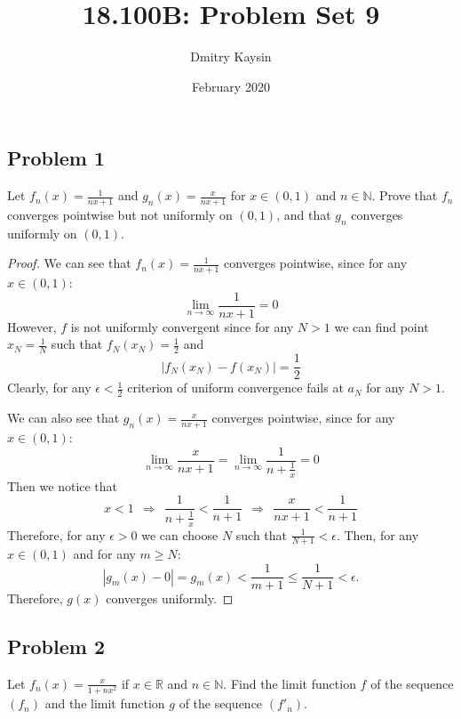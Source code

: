\documentclass{article}
\title{18.100B: Problem Set 9}
\author{Dmitry Kaysin}
\date{February 2020}
\newcommand{\R}{\mathbb{R}}
\newcommand{\N}{\mathbb{N}}
\begin{document}
\maketitle 


\subsection*{Problem 1}

\begin{tcolorbox}
Let $f_n(x) = \frac{1}{nx+1}$ and $g_n(x) = \frac{x}{nx+1}$ for $x \in (0, 1)$ and $n \in \N$.
Prove that $f_n$ converges pointwise but not uniformly on $(0, 1)$, and that $g_n$ converges uniformly on $(0, 1)$.
\end{tcolorbox}

\begin{proof}

We can see that $f_n(x) = \frac{1}{nx+1}$ converges pointwise, since for any $x \in (0,1)$:
\[ \lim_{n \to \infty} \frac{1}{nx+1} = 0 \]
However, $f$ is not uniformly convergent since for any $N > 1$ we can find point $x_N = \frac{1}{N}$ such that $f_N(x_N) = \frac{1}{2}$ and
$$ | f_N(x_N) - f(x_N) | = \frac{1}{2} $$
Clearly, for any $\epsilon < \frac{1}{2}$ criterion of uniform convergence fails at $a_N$ for any $N > 1$.

We can also see that $g_n(x) = \frac{x}{nx+1}$ converges pointwise, since for any $x \in (0,1)$:
\[ \lim_{n \to \infty} \frac{x}{nx+1} = \lim_{n \to \infty} \frac{1}{n+\frac{1}{x}} = 0 \]
Then we notice that
\[ x < 1 \>\> \Rightarrow \>\> \frac{1}{n+\frac{1}{x}} < \frac{1}{n+1} \>\> \Rightarrow \>\> \frac{x}{nx+1} < \frac{1}{n+1} \]
Therefore, for any $\epsilon>0$ we can choose $N$ such that $ \frac{1}{N+1} < \epsilon$.
Then, for any $x \in (0,1)$ and for any $m \geq N$:
\[ | g_m(x) - 0 | = g_m(x) < \frac{1}{m+1} \leq \frac{1}{N+1} < \epsilon. \]
Therefore, $g(x)$ converges uniformly.

\end{proof}


\subsection*{Problem 2}

\begin{tcolorbox}
Let $f_n (x) = \frac{x}{1 + nx^2}$ if $x \in \R$ and $n \in \N$.
Find the limit function $f$ of the sequence $(f_n)$ and the limit function $g$ of the sequence $(f'_n)$. 
\end{tcolorbox}
\end{document}
